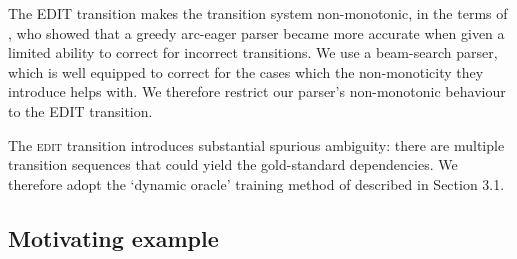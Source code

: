 \documentclass[11pt,letterpaper]{article}
\newcommand{\edittrans}{\textsc{edit}\xspace}
\begin{document}
The EDIT transition makes the transition system non-monotonic, in the terms of
\citet{goldberg:12},
who showed that a greedy arc-eager parser became more accurate when given a limited
ability to correct for incorrect transitions. We use a beam-search parser, which
is well equipped to correct for the cases which the non-monoticity they introduce
helps with. We therefore restrict our parser’s non-monotonic behaviour to the
EDIT transition.

The \edittrans transition introduces substantial spurious ambiguity: there are multiple
transition sequences that could yield the gold-standard dependencies. We therefore
adopt the `dynamic oracle' training method of \citet{goldberg:12} described in
Section 3.1.


\subsection{Motivating example}
\end{document}
